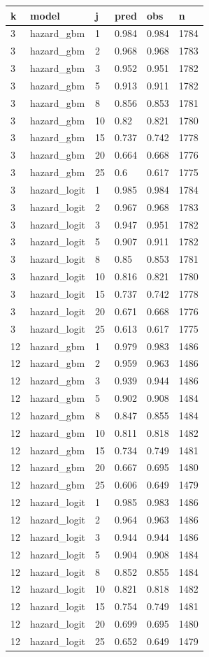 \begin{tabular}{llllll}
\toprule
k & model & j & pred & obs & n \\
\midrule
3 & hazard\_gbm & 1 & 0.984 & 0.984 & 1784 \\
3 & hazard\_gbm & 2 & 0.968 & 0.968 & 1783 \\
3 & hazard\_gbm & 3 & 0.952 & 0.951 & 1782 \\
3 & hazard\_gbm & 5 & 0.913 & 0.911 & 1782 \\
3 & hazard\_gbm & 8 & 0.856 & 0.853 & 1781 \\
3 & hazard\_gbm & 10 & 0.82 & 0.821 & 1780 \\
3 & hazard\_gbm & 15 & 0.737 & 0.742 & 1778 \\
3 & hazard\_gbm & 20 & 0.664 & 0.668 & 1776 \\
3 & hazard\_gbm & 25 & 0.6 & 0.617 & 1775 \\
3 & hazard\_logit & 1 & 0.985 & 0.984 & 1784 \\
3 & hazard\_logit & 2 & 0.967 & 0.968 & 1783 \\
3 & hazard\_logit & 3 & 0.947 & 0.951 & 1782 \\
3 & hazard\_logit & 5 & 0.907 & 0.911 & 1782 \\
3 & hazard\_logit & 8 & 0.85 & 0.853 & 1781 \\
3 & hazard\_logit & 10 & 0.816 & 0.821 & 1780 \\
3 & hazard\_logit & 15 & 0.737 & 0.742 & 1778 \\
3 & hazard\_logit & 20 & 0.671 & 0.668 & 1776 \\
3 & hazard\_logit & 25 & 0.613 & 0.617 & 1775 \\
12 & hazard\_gbm & 1 & 0.979 & 0.983 & 1486 \\
12 & hazard\_gbm & 2 & 0.959 & 0.963 & 1486 \\
12 & hazard\_gbm & 3 & 0.939 & 0.944 & 1486 \\
12 & hazard\_gbm & 5 & 0.902 & 0.908 & 1484 \\
12 & hazard\_gbm & 8 & 0.847 & 0.855 & 1484 \\
12 & hazard\_gbm & 10 & 0.811 & 0.818 & 1482 \\
12 & hazard\_gbm & 15 & 0.734 & 0.749 & 1481 \\
12 & hazard\_gbm & 20 & 0.667 & 0.695 & 1480 \\
12 & hazard\_gbm & 25 & 0.606 & 0.649 & 1479 \\
12 & hazard\_logit & 1 & 0.985 & 0.983 & 1486 \\
12 & hazard\_logit & 2 & 0.964 & 0.963 & 1486 \\
12 & hazard\_logit & 3 & 0.944 & 0.944 & 1486 \\
12 & hazard\_logit & 5 & 0.904 & 0.908 & 1484 \\
12 & hazard\_logit & 8 & 0.852 & 0.855 & 1484 \\
12 & hazard\_logit & 10 & 0.821 & 0.818 & 1482 \\
12 & hazard\_logit & 15 & 0.754 & 0.749 & 1481 \\
12 & hazard\_logit & 20 & 0.699 & 0.695 & 1480 \\
12 & hazard\_logit & 25 & 0.652 & 0.649 & 1479 \\
\bottomrule
\end{tabular}